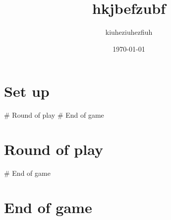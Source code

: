 \documentclass{article}%
\title{hkjbefzubf}%
\author{kiuheziuhezfiuh}%
\date{\today}%
\begin{document}
%
\pagestyle{empty}%
\normalsize%
\maketitle%
\section{ Set up
}%
\label{sec:Setup}%
\# Round of play
%
\# End of game

%
\section{ Round of play
}%
\label{sec:Roundofplay}%
\# End of game

%
\section{ End of game}%
\label{sec:Endofgame}%

%
\end{document}
